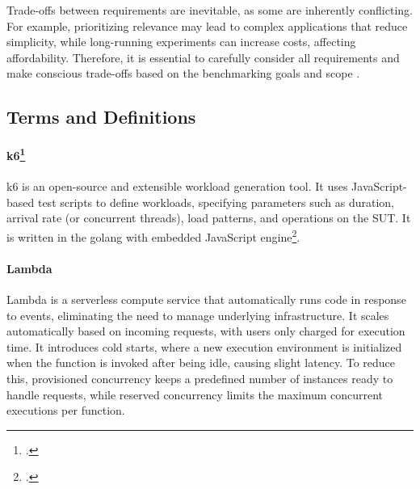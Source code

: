 Trade-offs between requirements are inevitable, as some are inherently conflicting. For example, prioritizing relevance may lead to complex applications that reduce simplicity, while long-running experiments can increase costs, affecting affordability. Therefore, it is essential to carefully consider all requirements and make conscious trade-offs based on the benchmarking goals and scope \cite{book_bermbach_cloud_service_benchmarking}.

\subsection{Terms and Definitions}
\label{challenges}

\paragraph{k6\footcite{https://k6.io/open-source/}}
k6 is an open-source and extensible workload generation tool. It uses JavaScript-based test scripts to define workloads, specifying parameters such as duration, arrival rate (or concurrent threads), load patterns, and operations on the SUT. It is written in the golang with embedded JavaScript engine\footcite{https://github.com/grafana/k6}.


\paragraph{Lambda}
Lambda is a serverless compute service that automatically runs code in response to events, eliminating the need to manage underlying infrastructure. It scales automatically based on incoming requests, with users only charged for execution time. It introduces cold starts, where a new execution environment is initialized when the function is invoked after being idle, causing slight latency. To reduce this, provisioned concurrency keeps a predefined number of instances ready to handle requests, while reserved concurrency limits the maximum concurrent executions per function.


